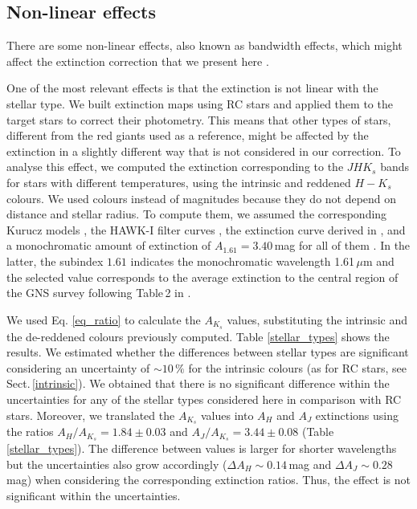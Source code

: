 \documentclass{aa}
\begin{document}
\subsection{Non-linear effects}


There are some non-linear effects, also known as bandwidth effects, which might affect the extinction correction that we present here \citep[][]{1980MNRAS.192..359J,2008BaltA..17..277S,Maiz-Apellaniz:2020aa}.




One of the most relevant effects is that the extinction is not linear with the stellar type. We built extinction maps using RC stars and applied them to  the target stars to correct their photometry. This means that other types of stars, different from the red giants used as a reference, might be affected by the extinction in a slightly different way that is not considered in our correction. To analyse this effect, we computed the extinction corresponding to the $JHK_s$ bands for stars with different temperatures, using the intrinsic and reddened $H-K_s$ colours. We used colours instead of magnitudes because they do not depend on distance and stellar radius. To compute them, we assumed the corresponding Kurucz models \citep{Kurucz:1993fk}, the HAWK-I filter curves \citep{Kissler-Patig:2008uq}, the extinction curve derived in \citet{Nogueras-Lara:2020aa}, and a monochromatic amount of extinction of $A_{1.61} = 3.40$\,mag for all of them \citep{Nogueras-Lara:2020aa}. In the latter, the subindex $1.61$ indicates the monochromatic wavelength 1.61\,$\mu$m and the selected value corresponds to the average extinction to the central region of the GNS survey following Table\,2 in \citet{Nogueras-Lara:2020aa}. 




We used Eq. \ref{eq_ratio} to calculate the $A_{K_s}$ values, substituting the intrinsic and the de-reddened colours previously computed. Table \ref{stellar_types} shows the results. We estimated whether the differences between stellar types are significant considering an uncertainty of $\sim10\,\%$ for the intrinsic colours (as for RC stars, see Sect.\,\ref{intrinsic}). We obtained that there is no significant difference within the uncertainties for any of the stellar types considered here in comparison with RC stars. Moreover, we translated the $A_{K_s}$ values into $A_H$ and $A_J$ extinctions using the ratios $A_{H}/A_{K_s} = 1.84\pm0.03$ and $A_{J}/A_{K_s} = 3.44\pm0.08$ (Table\,\ref{stellar_types}). The difference between values is larger for shorter wavelengths but the uncertainties also grow accordingly ($\Delta A_H\sim0.14$\,mag and $\Delta A_J\sim0.28$\,mag) when considering the corresponding extinction ratios. Thus, the effect is not significant within the uncertainties. \\
\end{document}
